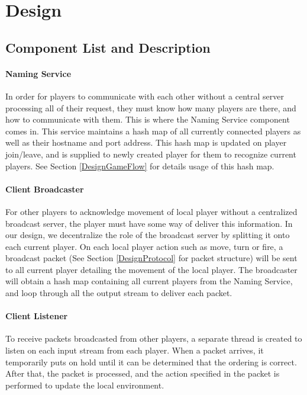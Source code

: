 \section{Design}\label{Design}

\subsection{Component List and Description}\label{DesignComponent}

\paragraph*{Naming Service}

In order for players to communicate with each other without a central server processing all of their request, they must know how many players are there, and how to communicate with them. This is where the Naming Service component comes in. This service maintains a hash map of all currently connected players as well as their hostname and port address. This hash map is updated on player join/leave, and is supplied to newly created player for them to recognize current players. See Section \ref{DesignGameFlow} for details usage of this hash map.

\paragraph*{Client Broadcaster}

For other players to acknowledge movement of local player without a centralized broadcast server, the player must have some way of deliver this information. In our design, we decentralize the role of the broadcast server by splitting it onto each current player. On each local player action such as move, turn or fire, a broadcast packet (See Section \ref{DesignProtocol} for packet structure) will be sent to all current player detailing the movement of the local player. The broadcaster will obtain a hash map containing all current players from the Naming Service, and loop through all the output stream to deliver each packet.

\paragraph*{Client Listener}

To receive packets broadcasted from other players, a separate thread is created to listen on each input stream from each player. When a packet arrives, it temporarily puts on hold until it can be determined that the ordering is correct. After that, the packet is processed, and the action specified in the packet is performed to update the local environment.

